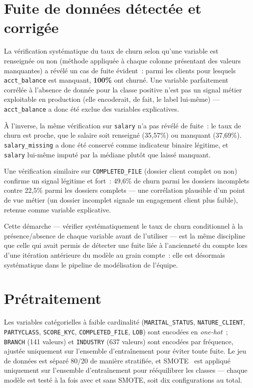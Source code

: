 \documentclass[11pt,a4paper]{report}
\renewenvironment{quote}{\begin{quotebox}}{\end{quotebox}}
\begin{document}
\section{Fuite de donn\'ees d\'etect\'ee et corrig\'ee}
\label{sec:leakage}

La v\'erification syst\'ematique du taux de churn selon qu'une variable est
renseign\'ee ou non (m\'ethode appliqu\'ee \`a chaque colonne pr\'esentant des
valeurs manquantes) a r\'ev\'el\'e un cas de fuite \'evident~: parmi les clients
pour lesquels \texttt{acct\_balance} est manquant, \textbf{100\%} ont churn\'e.
Une variable parfaitement corr\'el\'ee \`a l'absence de donn\'ee pour la classe
positive n'est pas un signal m\'etier exploitable en production (elle
encoderait, de fait, le label lui-m\^eme) --- \texttt{acct\_balance} a donc
\'et\'e exclue des variables explicatives.

\`A l'inverse, la m\^eme v\'erification sur \texttt{salary} n'a pas r\'ev\'el\'e de
fuite~: le taux de churn est proche, que le salaire soit renseign\'e
(35,57\%) ou manquant (37,69\%). \texttt{salary\_missing} a donc \'et\'e
conserv\'e comme indicateur binaire l\'egitime, et \texttt{salary} lui-m\^eme
imput\'e par la m\'ediane plut\^ot que laiss\'e manquant.

Une v\'erification similaire sur \texttt{COMPLETED\_FILE} (dossier client
complet ou non) confirme un signal l\'egitime et fort~: 49,6\% de churn parmi
les dossiers incomplets contre 22,5\% parmi les dossiers complets --- une
corr\'elation plausible d'un point de vue m\'etier (un dossier incomplet
signale un engagement client plus faible), retenue comme variable
explicative.

\begin{quote}
Cette d\'emarche --- v\'erifier syst\'ematiquement le taux de churn conditionnel
\`a la pr\'esence/absence de chaque variable avant de l'utiliser --- est la
m\^eme discipline que celle qui avait permis de d\'etecter une fuite li\'ee \`a
l'anciennet\'e du compte lors d'une it\'eration ant\'erieure du mod\`ele au grain
compte~: elle est d\'esormais syst\'ematique dans le pipeline de mod\'elisation
de l'\'equipe.
\end{quote}

\section{Pr\'etraitement}

Les variables cat\'egorielles \`a faible cardinalit\'e (\texttt{MARITAL\_STATUS},
\texttt{NATURE\_CLIENT}, \texttt{PARTYCLASS}, \texttt{SCORE\_KYC},
\texttt{COMPLETED\_FILE}, \texttt{LOB}) sont encod\'ees en \emph{one-hot}~;
\texttt{BRANCH} (141 valeurs) et \texttt{INDUSTRY} (637 valeurs) sont
encod\'ees par fr\'equence, ajust\'ee uniquement sur l'ensemble d'entra\^inement
pour \'eviter toute fuite. Le jeu de donn\'ees est s\'epar\'e 80/20 de mani\`ere
stratifi\'ee, et SMOTE~\citep{chawla2002smote} est appliqu\'e uniquement sur
l'ensemble d'entra\^inement pour r\'e\'equilibrer les classes --- chaque mod\`ele
est test\'e \`a la fois avec et sans SMOTE, soit dix configurations au total.
\end{document}

